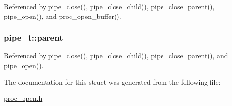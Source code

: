 Referenced by pipe\-\_\-close(), pipe\-\_\-close\-\_\-child(), pipe\-\_\-close\-\_\-parent(), pipe\-\_\-open(), and proc\-\_\-open\-\_\-buffer().

\hypertarget{structpipe__t_a5d4dc41ce76c8eaabe7120791af29a20}{
\subsubsection[{parent}]{ pipe\-\_\-t\-::parent}}\label{structpipe__t_a5d4dc41ce76c8eaabe7120791af29a20}


Referenced by pipe\-\_\-close(), pipe\-\_\-close\-\_\-child(), pipe\-\_\-close\-\_\-parent(), and pipe\-\_\-open().



The documentation for this struct was generated from the following file\-:\begin{DoxyCompactItemize}
\item 
\hyperlink{proc__open_8h}{proc\-\_\-open.\-h}\end{DoxyCompactItemize}
